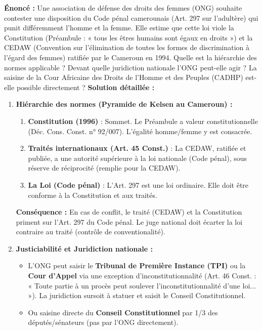 \documentclass[11pt]{article}
\newcommand{\cle}[1]{{\popxbold\color{popdark}#1}}
\begin{document}
\begin{exoresolu}
    \textbf{Énoncé :} Une association de défense des droits des femmes (ONG) souhaite contester une disposition du Code pénal camerounais (Art. 297 sur l'adultère) qui punit différemment l'homme et la femme. Elle estime que cette loi viole la Constitution (Préambule : « tous les êtres humains sont égaux en droits ») et la CEDAW (Convention sur l'élimination de toutes les formes de discrimination à l'égard des femmes) ratifiée par le Cameroun en 1994. Quelle est la hiérarchie des normes applicable ? Devant quelle juridiction nationale l'ONG peut-elle agir ? La saisine de la Cour Africaine des Droits de l'Homme et des Peuples (CADHP) est-elle possible directement ?
    \tcblower
    \textbf{Solution détaillée :}
    \begin{enumerate}
        \item \textbf{Hiérarchie des normes (Pyramide de Kelsen au Cameroun) :}
            \begin{enumerate}
                \item \textbf{Constitution (1996)} : Sommet. Le Préambule a valeur constitutionnelle (Déc. Cons. Const. n° 92/007). L'égalité homme/femme y est consacrée.
                \item \textbf{Traités internationaux (Art. 45 Const.)} : La \cle{CEDAW}, ratifiée et publiée, a une autorité supérieure à la loi nationale (Code pénal), sous réserve de réciprocité (remplie pour la CEDAW).
                \item \textbf{La Loi (Code pénal)} : L'Art. 297 est une loi ordinaire. Elle doit être conforme à la Constitution et aux traités.
            \end{enumerate}
            \textbf{Conséquence :} En cas de conflit, le traité (CEDAW) et la Constitution priment sur l'Art. 297 du Code pénal. Le juge national doit écarter la loi contraire au traité (contrôle de conventionalité).
        \item \textbf{Justiciabilité et Juridiction nationale :}
            \begin{itemize}
                \item L'ONG peut saisir le \textbf{Tribunal de Première Instance (TPI)} ou la \textbf{Cour d'Appel} via une \cle{exception d'inconstitutionnalité} (Art. 46 Const. : « Toute partie à un procès peut soulever l'inconstitutionnalité d'une loi... »). La juridiction sursoit à statuer et saisit le Conseil Constitutionnel.
                \item Ou saisine directe du \textbf{Conseil Constitutionnel} par 1/3 des députés/sénateurs (pas par l'ONG directement).

\end{itemize}
\end{enumerate}
\end{exoresolu}
\end{document}
